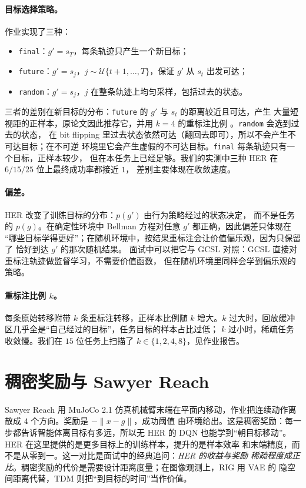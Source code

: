 \documentclass[10pt,twocolumn,a4paper]{ctexart}
\begin{document}
\paragraph{目标选择策略。}作业实现了三种：
\begin{itemize}
\item \texttt{final}：$g'=s_T$，每条轨迹只产生一个新目标；
\item \texttt{future}：$g'=s_{j}$，$j\sim\mathcal{U}\{t+1,\ldots,T\}$，保证 $g'$ 从
$s_t$ 出发可达；
\item \texttt{random}：$g'=s_j$，$j$ 在整条轨迹上均匀采样，包括过去的状态。
\end{itemize}
三者的差别在新目标的分布：\texttt{future} 的 $g'$ 与 $s_t$ 的距离较近且可达，产生
大量短视距的正样本，原论文因此推荐它，并用 $k=4$ 的重标注比例
\citep{andrychowicz2017her,plappert2018multigoal}。\texttt{random} 会选到过去的状态，
在 bit flipping 里过去状态依然可达（翻回去即可），所以不会产生不可达目标；在不可逆
环境里它会产生虚假的不可达目标。\texttt{final} 每条轨迹只有一个目标，正样本较少，
但在本任务上已经足够。我们的实测中三种 HER 在 $6/15/25$ 位上最终成功率都接近 $1$，
差别主要体现在收敛速度。

\paragraph{偏差。}HER 改变了训练目标的分布：$p(g')$ 由行为策略经过的状态决定，
而不是任务的 $p(g)$。在确定性环境中 Bellman 方程对任意 $g'$ 都正确，因此偏差只体现在
“哪些目标学得更好”；在随机环境中，按结果重标注会让价值偏乐观，因为只保留了
恰好到达 $g'$ 的那次随机结果\citep{eysenbach2020rewriting,li2020generalized}。
面试中可以把它与 GCSL 对照：GCSL 直接对重标注轨迹做监督学习，不需要价值函数，
但在随机环境里同样会学到偏乐观的策略\citep{ghosh2021gcsl}。

\paragraph{重标注比例 $k$。}每条原始转移附带 $k$ 条重标注转移，正样本比例随 $k$
增大。$k$ 过大时，回放缓冲区几乎全是“自己经过的目标”，任务目标的样本占比过低；
$k$ 过小时，稀疏任务收敛慢。我们在 $15$ 位任务上扫描了 $k\in\{1,2,4,8\}$，见作业报告。

\section{稠密奖励与 Sawyer Reach}
Sawyer Reach 用 MuJoCo 2.1 仿真机械臂末端在平面内移动，作业把连续动作离散成 $4$
个方向\citep{todorov2012mujoco,nair2018rig}。奖励是 $-\lVert x-g\rVert$，成功阈值
由环境给出。这是稠密奖励：每一步都告诉智能体离目标有多远，所以无 HER 的 DQN
也能学到“朝目标移动”。HER 在这里提供的是更多目标上的训练样本，提升的是样本效率
和末端精度，而不是从零到一。这一对比是面试中的经典追问：\emph{HER 的收益与奖励
稀疏程度成正比}。稠密奖励的代价是需要设计距离度量；在图像观测上，RIG 用 VAE 的
隐空间距离代替\citep{nair2018rig}，TDM 则把“到目标的时间”当作价值\citep{pong2018tdm}。
\end{document}
